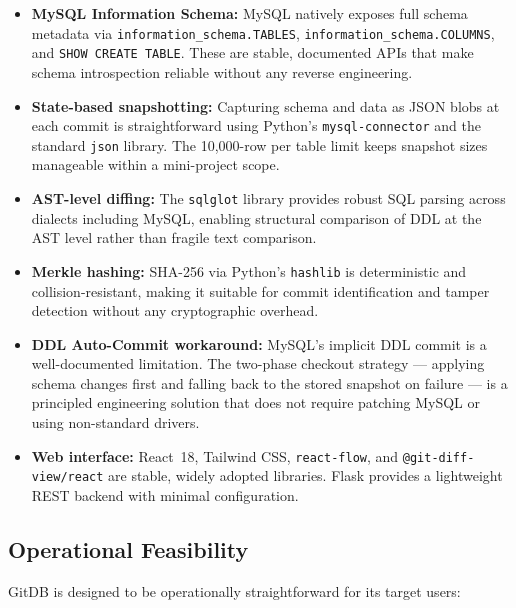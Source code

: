 \documentclass[12pt, a4paper]{article}
\begin{document}
\begin{itemize}[leftmargin=1.5em]

    \item \textbf{MySQL Information Schema:} MySQL natively exposes full schema
    metadata via \texttt{information\_schema.TABLES}, \texttt{information\_schema.COLUMNS},
    and \texttt{SHOW CREATE TABLE}. These are stable, documented APIs that make
    schema introspection reliable without any reverse engineering.

    \item \textbf{State-based snapshotting:} Capturing schema and data as JSON
    blobs at each commit is straightforward using Python's \texttt{mysql-connector}
    and the standard \texttt{json} library. The 10,000-row per table limit keeps
    snapshot sizes manageable within a mini-project scope.

    \item \textbf{AST-level diffing:} The \texttt{sqlglot} library provides
    robust SQL parsing across dialects including MySQL, enabling structural
    comparison of DDL at the AST level rather than fragile text comparison.

    \item \textbf{Merkle hashing:} SHA-256 via Python's \texttt{hashlib} is
    deterministic and collision-resistant, making it suitable for commit
    identification and tamper detection without any cryptographic overhead.

    \item \textbf{DDL Auto-Commit workaround:} MySQL's implicit DDL commit is
    a well-documented limitation. The two-phase checkout strategy --- applying
    schema changes first and falling back to the stored snapshot on failure ---
    is a principled engineering solution that does not require patching MySQL or
    using non-standard drivers.

    \item \textbf{Web interface:} React~18, Tailwind CSS, \texttt{react-flow},
        and \texttt{@git-diff-view/react} are stable, widely adopted libraries.
    Flask provides a lightweight REST backend with minimal configuration.

\end{itemize}

\subsection{Operational Feasibility}

GitDB is designed to be operationally straightforward for its target users:
\end{document}

